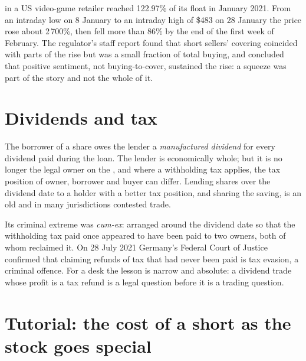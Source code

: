 \begin{example}[January 2021]\label{ex:m1:stock-loan-and-short-selling:gme}
 in a US video-game retailer reached 122.97\% of its float in
January 2021. From an intraday low on 8 January to an intraday high of \$483
on 28 January the price rose about 2\,700\%, then fell more than 86\% by the
end of the first week of February. The regulator's staff report found that
short sellers' covering coincided with parts of the rise but was a small
fraction of total buying, and concluded that positive sentiment, not
buying-to-cover, sustained the rise: a squeeze was part of the story and not
the whole of it.
\end{example}

\section{Dividends and tax}

The borrower of a share owes the lender a \emph{manufactured dividend} for
every dividend paid during the loan. The lender is economically whole; but it
is no longer the legal owner on the , and where a withholding tax
applies, the tax position of owner, borrower and buyer can differ. Lending
shares over the dividend date to a holder with a better tax position, and
sharing the saving, is an old and in many jurisdictions contested trade.

Its criminal extreme was \emph{cum-ex}:  arranged around the
dividend date so that the withholding tax paid once appeared to have been
paid to two owners, both of whom reclaimed it. On 28 July 2021 Germany's
Federal Court of Justice confirmed that claiming refunds of tax that had
never been paid is tax evasion, a criminal offence. For a desk the lesson is
narrow and absolute: a dividend trade whose profit is a tax refund is a legal
question before it is a trading question.

\section{Tutorial: the cost of a short as the stock goes special}\label{tut:m1:stock-loan-and-short-selling:cost}

